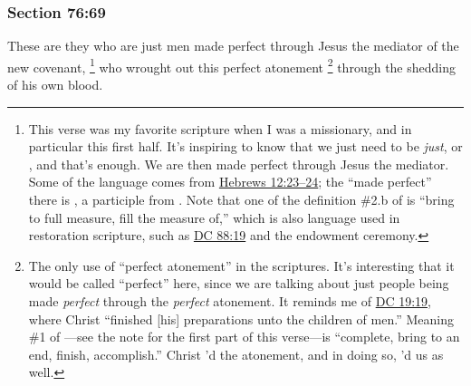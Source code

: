 
	\subsubsection{Section 76:69} %
		\label{DC76-69}

		These are they who are just men made perfect through Jesus the mediator of the new covenant,%
			\footnote{%
				This verse was my favorite scripture when I was a missionary, and in particular this first half. It's inspiring to know that we just need to be \textit{just}, or \hyperref[DIKAIOS]{}, and that's enough. We are then made perfect through Jesus the mediator. Some of the language comes from \hyperref[HEBREWS-12-23]{Hebrews 12:23--24}; the ``made perfect'' there is , a participle from \hyperref[TELEIOO]{}. Note that one of the definition \#2.b of  is ``bring to full measure, fill the measure of,'' which is also language used in restoration scripture, such as \hyperref[DC88-19]{DC 88:19} and the endowment ceremony.
				}
		who wrought out this perfect atonement%
			\footnote{%
				The only use of ``perfect atonement'' in the scriptures. It's interesting that it would be called ``perfect'' here, since we are talking about just people being made \textit{perfect} through the \textit{perfect} atonement. It reminds me of \hyperref[DC19-19]{DC 19:19}, where Christ ``finished [his] preparations unto the children of men.'' Meaning \#1 of \hyperref[TELEIOO]{}---see the note for the first part of this verse---is ``complete, bring to an end, finish, accomplish.'' Christ 'd the atonement, and in doing so, 'd us as well.
				}
		through the shedding of his own blood.



